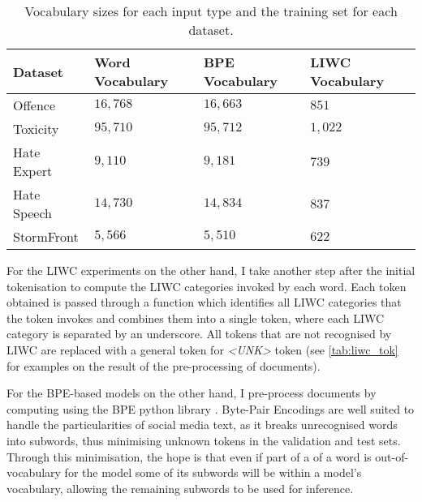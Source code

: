 \begin{table}[]
\centering
\begin{tabular}{llll}
Dataset     & Word Vocabulary & BPE Vocabulary & LIWC Vocabulary \\\hline
Offence     & $16,768$        & $16,663$       & $851$           \\
Toxicity    & $95,710$        & $95,712$       & $1,022$         \\
Hate Expert & $9,110$         & $9,181$        & $739$           \\
Hate Speech & $14,730$        & $14,834$       & $837$           \\
StormFront  & $5,566$         & $5,510$        & $622$
\end{tabular}
\caption{Vocabulary sizes for each input type and the training set for each dataset.}
\label{tab:vocab_sizes}
\end{table}

For the LIWC experiments on the other hand, I take another step after the initial tokenisation to compute the LIWC categories invoked by each word. Each token obtained is passed through a function which identifies all LIWC categories that the token invokes and combines them into a single token, where each LIWC category is separated by an underscore. All tokens that are not recognised by LIWC are replaced with a general token for \textit{<UNK>} token (see \cref{tab:liwc_tok} for examples on the result of the pre-processing of documents).

For the BPE-based models on the other hand, I pre-process documents by computing using the BPE python library \citep{Heinzerling:2018}. Byte-Pair Encodings are well suited to handle the particularities of social media text, as it breaks unrecognised words into subwords, thus minimising unknown tokens in the validation and test sets. Through this minimisation, the hope is that even if part of a of a word is out-of-vocabulary for the model some of its subwords will be within a model's vocabulary, allowing the remaining subwords to be used for inference.

\begin{table}
  \centering
  \caption{Word token and BPE representation.}
  \label{tab:bpe_tok}
\end{table}

